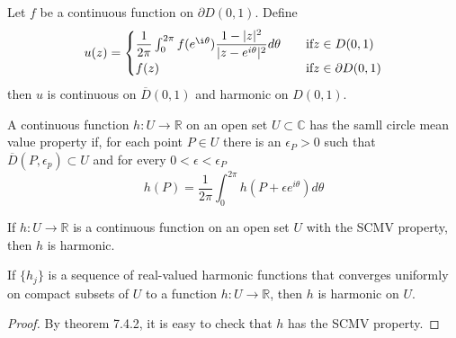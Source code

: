 \documentclass[lang=en, color=blue, ]{elegantbook}
\newcommand{\R}{\mathbb{R}}
\newcommand{\C}{\mathbb{C}}
\begin{document}
\begin{theorem}
    Let $f$ be a continuous function on $\partial D(0,1)$. Define
    \[
    u(z) = \begin{cases}
        \dfrac{1}{2\pi} \int_0^{2\pi} f(e^{\i\theta})\dfrac{1-|z|^2}{|z-e^{i\theta}|^2}d\theta\quad&\text{if}z\in D(0,1)\\
        f(z)&\text{if}z\in\partial D(0,1)
    \end{cases}
    \]
    then $u$ is continuous on $\overline{D}(0,1)$ and harmonic on $D(0,1)$.
\end{theorem}

\begin{definition}
    A continuous function $h:U\to\R$ on an open set $U\subset \C$ has the samll circle mean value property if, for each point $P\in U$ there is an $\epsilon_P>0$ such that $\overline{D}(P,\epsilon_p)\subset U$ and for every $0<\epsilon <\epsilon_P$
    \[h(P) = \dfrac{1}{2\pi}\int_0^{2\pi}h(P+\epsilon e^{i\theta})d\theta\]
\end{definition}
\begin{theorem}
    If $h:U\to\R$ is a continuous function on an open set $U$ with the SCMV property, then $h$ is harmonic.
\end{theorem}

\begin{corollary}
    If $\{h_j\}$ is a sequence of real-valued harmonic functions that converges uniformly on compact subsets of $U$ to a function $h:U\to\R$, then $h$ is harmonic on $U$.
\end{corollary}
\begin{proof}
    By theorem 7.4.2, it is easy to check that $h$ has the SCMV property.
\end{proof}
\end{document}
